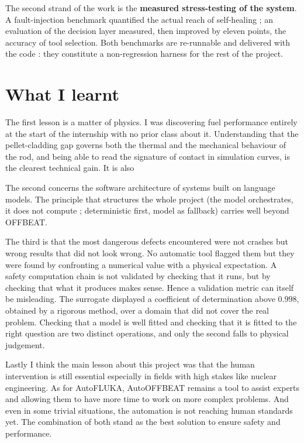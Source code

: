 \documentclass[12pt,a4paper]{report}
\begin{document}
The second strand of the work is the
\textbf{measured stress-testing of the system}. A fault-injection benchmark
quantified the actual reach of self-healing ; an evaluation of the decision layer
measured, then improved by eleven points, the accuracy of tool selection. Both
benchmarks are re-runnable and delivered with the code : they constitute a
non-regression harness for the rest of the project.

\section*{What I learnt}

The first lesson is a matter of physics. I was discovering fuel performance entirely at
the start of the internship with no prior class about it. Understanding that the pellet-cladding gap governs
both the thermal and the mechanical behaviour of the rod, and being able to read
the signature of contact in simulation curves, is the clearest technical gain. It is also 

The second concerns the software architecture of systems built on language
models. The principle that structures the whole project (the model orchestrates,
it does not compute ; deterministic first, model as fallback) carries well beyond
OFFBEAT.

The third is that the most
dangerous defects encountered were not crashes but wrong results that did not
look wrong. No automatic tool flagged them but they were found by confronting a
numerical value with a physical expectation. A safety computation chain is not
validated by checking that it runs, but by checking that what it produces makes
sense. Hence a validation metric can itself be misleading. The surrogate displayed a coefficient of determination
above $0.998$, obtained by a rigorous method, over a domain that did not cover
the real problem. Checking that a model is well fitted and checking that it is
fitted to the right question are two distinct operations, and only the second
falls to physical judgement.

Lastly I think the main lesson about this project was that the human intervention is still essential especially in fields
with high stakes like nuclear engineering. As for AutoFLUKA, AutoOFFBEAT remains a tool to assist experts and allowing them to have
more time to work on more complex problems. And even in some trivial situations, the automation is not reaching human standards yet. The combination of both stand as the best solution to ensure safety and performance.
\end{document}
